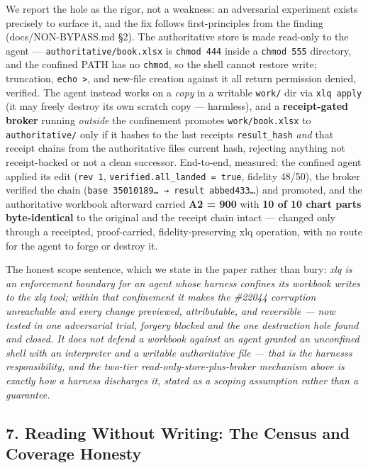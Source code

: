 \documentclass[
]{article}
\begin{document}
We report the hole as the rigor, not a weakness: an adversarial
experiment exists precisely to surface it, and the fix follows
first-principles from the finding (docs/NON-BYPASS.md §2). The
authoritative store is made read-only to the agent ---
\texttt{authoritative/book.xlsx} is \texttt{chmod\ 444} inside a
\texttt{chmod\ 555} directory, and the confined PATH has no
\texttt{chmod}, so the shell cannot restore write; truncation,
\texttt{echo\ \textgreater{}}, and new-file creation against it all
return permission denied, verified. The agent instead works on a
\emph{copy} in a writable \texttt{work/} dir via \texttt{xlq\ apply} (it
may freely destroy its own scratch copy --- harmless), and a
\textbf{receipt-gated broker} running \emph{outside} the confinement
promotes \texttt{work/book.xlsx} to \texttt{authoritative/} only if it
hashes to the last receipt\textquotesingle s \texttt{result\_hash}
\emph{and} that receipt chains from the authoritative
file\textquotesingle s current hash, rejecting anything not
receipt-backed or not a clean successor. End-to-end, measured: the
confined agent applied its edit (\texttt{rev\ 1},
\texttt{verified.all\_landed\ =\ true}, fidelity 48/50), the broker
verified the chain (\texttt{base\ 35010189…\ →\ result\ abbed433…}) and
promoted, and the authoritative workbook afterward carried \textbf{A2 =
900} with \textbf{10 of 10 chart parts byte-identical} to the original
and the receipt chain intact --- changed only through a receipted,
proof-carried, fidelity-preserving xlq operation, with no route for the
agent to forge or destroy it.

The honest scope sentence, which we state in the paper rather than bury:
\emph{xlq is an enforcement boundary for an agent whose harness confines
its workbook writes to the xlq tool; within that confinement it makes
the \#22044 corruption unreachable and every change previewed,
attributable, and reversible --- now tested in one adversarial trial,
forgery blocked and the one destruction hole found and closed. It does
not defend a workbook against an agent granted an unconfined shell with
an interpreter and a writable authoritative file --- that is the
harness\textquotesingle s responsibility, and the two-tier
read-only-store-plus-broker mechanism above is exactly how a harness
discharges it, stated as a scoping assumption rather than a guarantee.}

\subsection{7. Reading Without Writing: The Census and Coverage
Honesty}\label{7-reading-without-writing-the-census-and-coverage-honesty}
\end{document}
